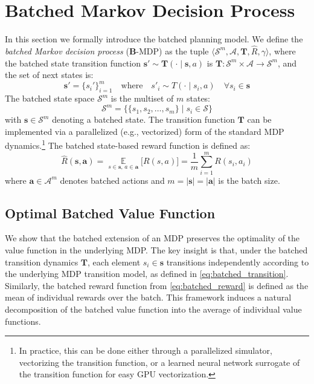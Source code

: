 \section{Batched Markov Decision Process}\label{sec:batched_mdp}
In this section we formally introduce the batched planning model.
We define the \textit{batched Markov decision process} (\textbf{B}-MDP) as the tuple $\langle \mathcal{S}^m, \mathcal{A}, \mathbf{T}, \widehat{R}, \gamma \rangle$, where the batched state transition function $\mathbf{s}' \sim \mathbf{T}(\cdot \mid \mathbf{s}, a)$ is $\mathbf{T}: \mathcal{S}^m \times \mathcal{A} \to \mathcal{S}^m$, and the set of next states is:
\begin{equation}\label{eq:batched_transition}
    \mathbf{s}' = \big\{s_i'\big\}_{i=1}^m \quad \text{where} \quad s'_i \sim T(\cdot \mid s_i, a) \quad \forall s_i \in \mathbf{s}
\end{equation}
The batched state space $\mathcal{S}^m$ is the multiset of $m$ states:
\begin{equation}
    \mathcal{S}^m = \big\{ \{s_1,s_2,\ldots,s_m\} \mid s_i \in \mathcal{S} \big\}
\end{equation}
with $\mathbf{s} \in \mathcal{S}^m$ denoting a batched state.
The transition function $\mathbf{T}$ can be implemented via a parallelized (e.g., vectorized) form of the standard MDP dynamics.\footnote{In practice, this can be done either through a parallelized simulator, vectorizing the transition function, or a learned neural network surrogate of the transition function for easy GPU vectorization.}
The batched state-based reward function is defined as:
\begin{equation}\label{eq:batched_reward}
    \widehat{R}(\mathbf{s}, \mathbf{a}) = \operatorname*{\mathbb{E}}_{s \in \mathbf{s},\, a \in \mathbf{a}}\big[ R(s,a) \big] = \frac{1}{m}\sum_{i=1}^m R(s_i, a_i)
\end{equation}
where $\mathbf{a} \in \mathcal{A}^m$ denotes batched actions and $m = |\mathbf{s}| = |\mathbf{a}|$ is the batch size.

\subsection{Optimal Batched Value Function}
We show that the batched extension of an MDP preserves the optimality of the value function in the underlying MDP.
The key insight is that, under the batched transition dynamics $\mathbf{T}$, each element $s_i \in \mathbf{s}$ transitions independently according to the underlying MDP transition model, as defined in \cref{eq:batched_transition}.
Similarly, the batched reward function from \cref{eq:batched_reward} is defined as the mean of individual rewards over the batch.
This framework induces a natural decomposition of the batched value function into the average of individual value functions.

